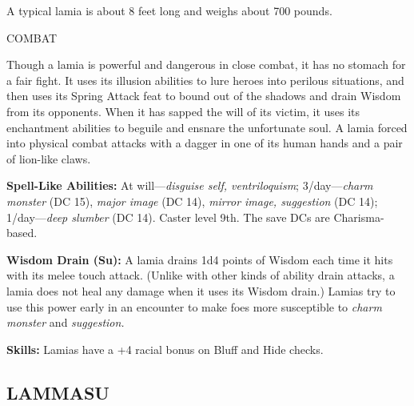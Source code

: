 \documentclass{article}
\begin{document}
A typical lamia is about 8 feet long and weighs about 700 pounds.

COMBAT

Though a lamia is powerful and dangerous in close combat, it has no stomach for 
a fair fight. It uses its illusion abilities to lure heroes into perilous situations, 
and then uses its Spring Attack feat to bound out of the shadows and drain Wisdom 
from its opponents. When it has sapped the will of its victim, it uses its enchantment 
abilities to beguile and ensnare the unfortunate soul. A lamia forced into physical 
combat attacks with a dagger in one of its human hands and a pair of lion-like 
claws.

\textbf{Spell-Like Abilities:} At will---\textit{disguise self, ventriloquism}; 
3/day---\textit{charm monster }(DC 15), \textit{major image }(DC 14), \textit{mirror 
image, suggestion }(DC 14); 1/day---\textit{deep slumber }(DC 14). Caster level 
9th. The save DCs are Charisma-based.

\textbf{Wisdom Drain (Su):} A lamia drains 1d4 points of Wisdom each time it hits 
with its melee touch attack. (Unlike with other kinds of ability drain attacks, 
a lamia does not heal any damage when it uses its Wisdom drain.) Lamias try to 
use this power early in an encounter to make foes more susceptible to \textit{charm 
monster }and \textit{suggestion.}

\textbf{Skills:} Lamias have a +4 racial bonus on Bluff and Hide checks.

\vspace{12pt}
\subsection*{{\LARGE{}LAMMASU}}
\end{document}
